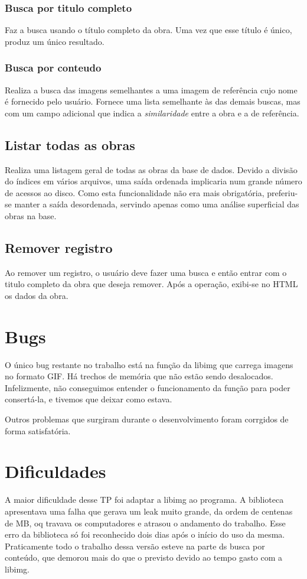 \documentclass[10pt,a4paper,draft]{article}
\begin{document}
\subsubsection{Busca por titulo completo}
Faz a busca usando o título completo da obra. Uma vez que esse título é único, produz um único resultado.

\subsubsection{Busca por conteudo}
Realiza a busca das imagens semelhantes a uma imagem de referência cujo nome é fornecido pelo usuário. Fornece uma lista semelhante às das demais buscas, mas com um campo adicional que indica a \textit{similaridade} entre a obra e a de referência.

\subsection{Listar todas as obras}
Realiza uma listagem geral de todas as obras da base de dados. Devido a divisão do índices em vários arquivos, uma saída ordenada implicaria num grande número de acessos ao disco. Como esta funcionalidade não era mais obrigatória, preferiu-se manter a saída desordenada, servindo apenas como uma análise superficial das obras na base.

\subsection{Remover registro}
Ao remover um registro, o usuário deve fazer uma busca e então entrar com o titulo completo da obra que deseja remover. Após a operação, exibi-se no HTML os dados da obra.

\section{Bugs}
O único bug restante no trabalho está na função da libimg que carrega imagens no formato GIF. Há trechos de memória que não estão sendo desalocados. Infelizmente, não conseguimos entender o funcionamento da função para poder consertá-la, e tivemos que deixar como estava.

Outros problemas que surgiram durante o desenvolvimento foram corrgidos de forma satisfatória.

\section{Dificuldades}
A maior dificuldade desse TP foi adaptar a libimg ao programa. A biblioteca apresentava uma falha que gerava um leak muito grande, da ordem de centenas de MB, oq travava os computadores e atrasou o andamento do trabalho. Esse erro da biblioteca só foi reconhecido dois dias após o início do uso da mesma. Praticamente todo o trabalho dessa versão esteve na parte ds busca por conteúdo, que demorou mais do que o previsto devido ao tempo gasto com a libimg.
\end{document}
